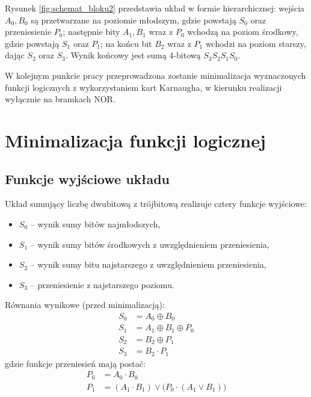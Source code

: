 \documentclass[11pt]{article}
\begin{document}
Rysunek \ref{fig:schemat_bloku2} przedstawia układ w formie hierarchicznej: wejścia \(A_0, B_0\) są przetwarzane na poziomie młodszym, gdzie powstają \(S_0\) oraz przeniesienie \(P_0\); następnie bity \(A_1, B_1\) wraz z \(P_0\) wchodzą na poziom środkowy, gdzie powstają \(S_1\) oraz \(P_1\); na końcu bit \(B_2\) wraz z \(P_1\) wchodzi na poziom starszy, dając \(S_2\) oraz \(S_3\). Wynik końcowy jest sumą 4-bitową \(S_3 S_2 S_1 S_0\).

W kolejnym punkcie pracy przeprowadzona zostanie minimalizacja wyznaczonych funkcji logicznych z wykorzystaniem kart Karnaugha, w kierunku realizacji wyłącznie na bramkach NOR.

\section{Minimalizacja funkcji logicznej}

\subsection{Funkcje wyjściowe układu}

Układ sumujący liczbę dwubitową z trójbitową realizuje cztery funkcje wyjściowe:
\begin{itemize}
    \item \(S_0\) -- wynik sumy bitów najmłodszych,
    \item \(S_1\) -- wynik sumy bitów środkowych z uwzględnieniem przeniesienia,
    \item \(S_2\) -- wynik sumy bitu najstarszego z uwzględnieniem przeniesienia,
    \item \(S_3\) -- przeniesienie z najstarszego poziomu.
\end{itemize}

Równania wynikowe (przed minimalizacją):
\begin{align}
S_0 &= A_0 \oplus B_0 \\
S_1 &= A_1 \oplus B_1 \oplus P_0 \\
S_2 &= B_2 \oplus P_1 \\
S_3 &= B_2 \cdot P_1
\end{align}
gdzie funkcje przeniesień mają postać:
\begin{align}
P_0 &= A_0 \cdot B_0 \\
P_1 &= (A_1 \cdot B_1) \lor \bigl(P_0 \cdot (A_1 \lor B_1)\bigr)
\end{align}
\end{document}
